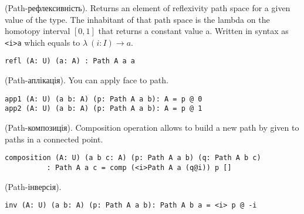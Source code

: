\begin{definition} (Path-рефлексивність).
Returns an element of reflexivity path space for a given value of the type.
The inhabitant of that path space is the lambda on the homotopy
interval $[0,1]$ that returns a constant value a. Written in
syntax as \lstinline{<i>a} which equals to $\lambda\ (i: I) \rightarrow a$.
\begin{lstlisting}
refl (A: U) (a: A) : Path A a a
\end{lstlisting}
\end{definition}

\begin{definition} (Path-аплікація).
You can apply face to path.
\begin{lstlisting}
app1 (A: U) (a b: A) (p: Path A a b): A = p @ 0
app2 (A: U) (a b: A) (p: Path A a b): A = p @ 1
\end{lstlisting}
\end{definition}

\begin{definition} (Path-композиція).
Composition operation allows to build a new path by given to paths
in a connected point.
\begin{center}
\end{center}
\begin{lstlisting}
composition (A: U) (a b c: A) (p: Path A a b) (q: Path A b c)
          : Path A a c = comp (<i>Path A a (q@i)) p []
\end{lstlisting}
\end{definition}

\begin{theorem} (Path-інверсія).
\begin{lstlisting}
inv (A: U) (a b: A) (p: Path A a b): Path A b a = <i> p @ -i
\end{lstlisting}
\end{theorem}

